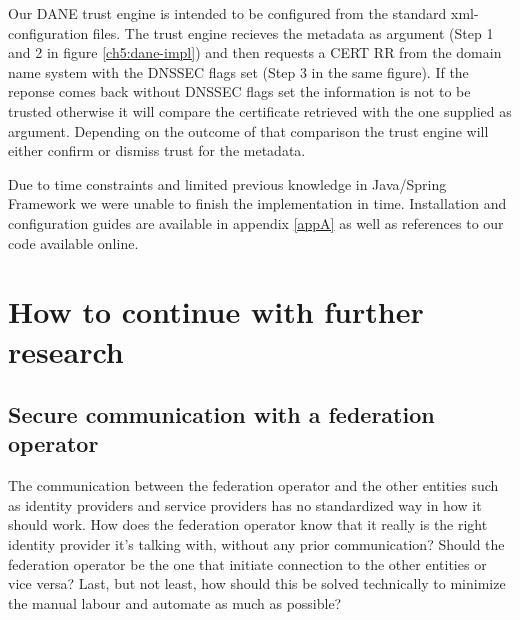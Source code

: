 Our DANE trust engine is intended to be configured from the standard xml-configuration files. 
The trust engine recieves the metadata as argument (Step 1 and 2 in figure \ref{ch5:dane-impl}) and then requests a CERT RR from the domain name system with the DNSSEC flags set (Step 3 in the same figure). 
If the reponse comes back without DNSSEC flags set the information is not to be trusted otherwise it will compare the certificate retrieved with the one supplied as argument.
Depending on the outcome of that comparison the trust engine will either confirm or dismiss trust for the metadata.

Due to time constraints and limited previous knowledge in Java/Spring Framework we were unable to finish the implementation in time.
Installation and configuration guides are available in appendix \ref{appA} as well as references to our code available online.





\section{How to continue with further research}
\subsection{Secure communication with a federation operator}
The communication between the federation operator and the other entities such as identity providers and service providers has no standardized way in how it should work.
How does the federation operator know that it really is the right identity provider it's talking with, without any prior communication?
Should the federation operator be the one that initiate connection to the other entities or vice versa?
Last, but not least, how should this be solved technically to minimize the manual labour and automate as much as possible?

